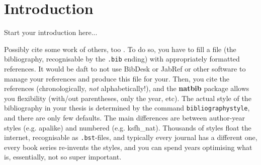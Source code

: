 \chapter{Introduction}
\label{ch:introduction}


Start your introduction here...

Possibly cite some work of others, too \citep{Adiku1995}. To do so, you have to fill a file (the bibliography, recognisable by the \texttt{.bib} ending) with appropriately formatted references. It would be daft to not use BibDesk or JabRef or other software to manage your references and produce this file for your. Then, you cite the references (chronologically, \emph{not} alphabetically!), and the \textbf{natbib} package allows you flexibility (with/out parentheses, only the year, etc). The actual style of the bibliography in your thesis is determined by the command \texttt{bibliographystyle}, and there are only few defaults. The main differences are between author-year styles (e.g. apalike) and numbered (e.g. ksfh\_nat). Thousands of styles float the internet, recognisable as \texttt{.bst}-files, and typically every journal has a different one, every book series re-invents the styles, and you can spend years optimising what is, essentially, not so super important.

